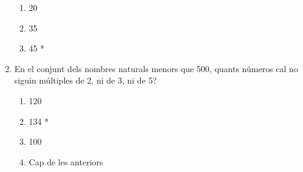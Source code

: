 \begin{enumerate}
\begin{enumerate}
\item 20

\item 35

\item 45 *
\end{enumerate}

\item En el conjunt dels nombres naturals menors que 500, \textquestiondown %
quants n\'{u}meros cal no siguin m\'{u}ltiples de 2, ni de 3, ni de 5?

\begin{enumerate}
\item 120

\item 134 *

\item 100

\item Cap de les anteriors
\end{enumerate}
\end{enumerate}


